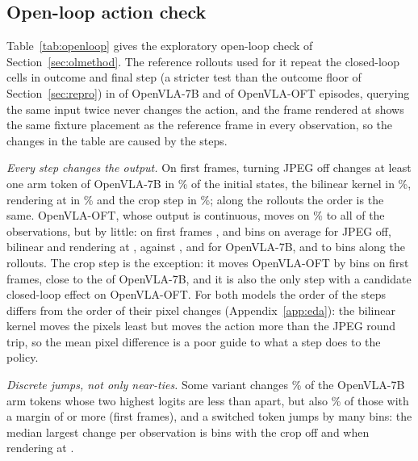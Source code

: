 \subsection{Open-loop action check}
\label{sec:openloop}



Table~\ref{tab:openloop} gives the exploratory open-loop check of Section~\ref{sec:olmethod}. The reference rollouts used for it repeat the closed-loop cells in outcome and final step (a stricter test than the outcome floor of Section~\ref{sec:repro}) in \OlSevTrajRepro{} of \OlSevTrajReproN{} OpenVLA-7B and \OlOftTrajRepro{} of \OlOftTrajReproN{} OpenVLA-OFT episodes, querying the same input twice never changes the action, and the frame rendered at \InputRes{} shows the same fixture placement as the reference frame in every observation, so the changes in the table are caused by the steps.

\emph{Every step changes the output.} On first frames, turning JPEG off changes at least one arm token of OpenVLA-7B in \OlSevFirstJpegChanged\% of the initial states, the bilinear kernel in \OlSevFirstBilChanged\%, rendering at \InputRes{} in \OlSevFirstRendChanged\% and the crop step in \OlSevFirstCropChanged\%; along the rollouts the order is the same. OpenVLA-OFT, whose output is continuous, moves on \OlOftTrajJpegChanged\% to all of the observations, but by little: on first frames \OlOftFirstJpegMean, \OlOftFirstBilMean{} and \OlOftFirstRendMean{} bins on average for JPEG off, bilinear and rendering at \InputRes, against \OlSevFirstJpegMean, \OlSevFirstBilMean{} and \OlSevFirstRendMean{} for OpenVLA-7B, and \OlOftTrajJpegMean{} to \OlOftTrajBilMean{} bins along the rollouts. The crop step is the exception: it moves OpenVLA-OFT by \OlOftFirstCropMean{} bins on first frames, close to the \OlSevFirstCropMean{} of OpenVLA-7B, and it is also the only step with a candidate closed-loop effect on OpenVLA-OFT. For both models the order of the steps differs from the order of their pixel changes (Appendix~\ref{app:eda}): the bilinear kernel moves the pixels least but moves the action more than the JPEG round trip, so the mean pixel difference is a poor guide to what a step does to the policy.

\emph{Discrete jumps, not only near-ties.} Some variant changes \OlSevFirstMarginLow\% of the OpenVLA-7B arm tokens whose two highest logits are less than \MarginLow{} apart, but also \OlSevFirstMarginHigh\% of those with a margin of \MarginHigh{} or more (first frames), and a switched token jumps by many bins: the median largest change per observation is \OlSevFirstCropMedmax{} bins with the crop off and \OlSevFirstRendMedmax{} when rendering at \InputRes.

